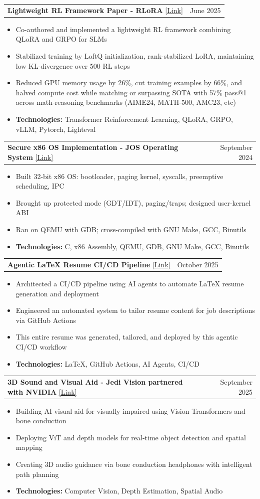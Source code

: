 \documentclass[letterpaper,11pt]{article}
\makeatletter
\newcommand{\resumeItem}[1]{
\item\small{
    {#1 \vspace{-2pt}}
  }
}
\newcommand{\resumeProjectHeading}[2]{
\item
  \begin{tabular*}{0.97\textwidth}{l@{\extracolsep{\fill}}r}
    \small#1 & #2 \\
  \end{tabular*}\vspace{-7pt}
}
\newcommand{\resumeItemListStart}{
\begin{itemize}}
\newcommand{\resumeItemListEnd}{
\end{itemize}\vspace{-5pt}}
\makeatother
\begin{document}
\resumeProjectHeading
{\textbf{Lightweight RL Framework Paper - RLoRA} \href{https://tinyurl.com/rlorafullpaper}{[Link]}}{June 2025}
\resumeItemListStart
\resumeItem{Co-authored and implemented a lightweight RL framework combining QLoRA and GRPO for SLMs}
\resumeItem{Stabilized training by LoftQ initialization, rank-stabilized LoRA, maintaining low KL-divergence over 500 RL steps}
\resumeItem{Reduced GPU memory usage by 26\%, cut training examples by 66\%, and halved compute cost while matching or surpassing SOTA with 57\% pass@1 across math-reasoning benchmarks (AIME24, MATH-500, AMC23, etc)}
\resumeItem{\textbf{Technologies:} Transformer Reinforcement Learning, QLoRA, GRPO, vLLM, Pytorch, Lighteval}
\resumeItemListEnd

\resumeProjectHeading
{\textbf{Secure x86 OS Implementation - JOS Operating System} \href{https://github.com/aj-arts/jos-operating-system-implementation}{[Link]}}{September 2024}
\resumeItemListStart
\resumeItem{Built 32-bit x86 OS: bootloader, paging kernel, syscalls, preemptive scheduling, IPC}
\resumeItem{Brought up protected mode (GDT/IDT), paging/traps; designed user-kernel ABI}
\resumeItem{Ran on QEMU with GDB; cross-compiled with GNU Make, GCC, Binutils}
\resumeItem{\textbf{Technologies:} C, x86 Assembly, QEMU, GDB, GNU Make, GCC, Binutils}
\resumeItemListEnd

\resumeProjectHeading
{\textbf{Agentic LaTeX Resume CI/CD Pipeline} \href{https://github.com/aj-arts/ajinkya-resume}{[Link]}}{October 2025}
\resumeItemListStart
\resumeItem{Architected a CI/CD pipeline using AI agents to automate LaTeX resume generation and deployment}
\resumeItem{Engineered an automated system to tailor resume content for job descriptions via GitHub Actions}
\resumeItem{This entire resume was generated, tailored, and deployed by this agentic CI/CD workflow}
\resumeItem{\textbf{Technologies:} LaTeX, GitHub Actions, AI Agents, CI/CD}
\resumeItemListEnd

\resumeProjectHeading
{\textbf{3D Sound and Visual Aid - Jedi Vision partnered with NVIDIA} \href{https://github.com/Jedi-Vision/jedi-vision-nano-code}{[Link]}}{September 2025}
\resumeItemListStart
\resumeItem{Building AI visual aid for visually impaired using Vision Transformers and bone conduction}
\resumeItem{Deploying ViT and depth models for real-time object detection and spatial mapping}
\resumeItem{Creating 3D audio guidance via bone conduction headphones with intelligent path planning}
\resumeItem{\textbf{Technologies:} Computer Vision, Depth Estimation, Spatial Audio}
\resumeItemListEnd
\end{document}
